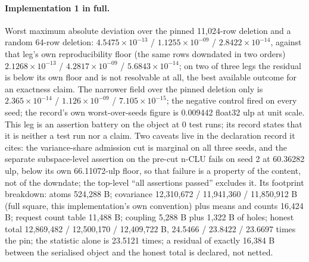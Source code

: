 \documentclass{article} %
\newcommand{\sci}[2]{\ensuremath{#1\times10^{#2}}}
\begin{document}
\paragraph{Implementation 1 in full.} Worst maximum absolute deviation over the pinned 11,024-row
deletion and a random 64-row deletion: \sci{4.5475}{-13} / \sci{1.1255}{-09} / \sci{2.8422}{-14},
against that leg's own reproducibility floor (the same rows downdated in two orders)
\sci{2.1268}{-13} / \sci{4.2817}{-09} / \sci{5.6843}{-14}; on two of three legs the residual is below
its own floor and is not resolvable at all, the best available outcome for an exactness claim. The
narrower field over the pinned deletion only is \sci{2.365}{-14} / \sci{1.126}{-09} /
\sci{7.105}{-15}; the negative control fired on every seed; the record's own worst-over-seeds
figure is 0.009442 float32 ulp at unit scale. %
This leg is an assertion battery on the object at 0 test runs; its record states that it is neither a test
run nor a claim. Two caveats live in the declaration record it cites: the variance-share admission cut is
marginal on all three seeds, and the separate subspace-level assertion on the pre-cut n-CLU fails on
seed 2 at 60.36282 ulp, below its own 66.11072-ulp floor, so that failure is a property of the
content, not of the downdate; the top-level ``all assertions passed'' excludes it.
Its footprint breakdown: atoms 524,288 B; covariance 12,310,672 / 11,941,360 / 11,850,912 B (full
square, this implementation's own convention) plus means and counts 16,424 B; request count table
11,488 B; coupling 5,288 B plus 1,322 B of holes; honest total 12,869,482 / 12,500,170 / 12,409,722
B, 24.5466 / 23.8422 / 23.6697 times the pin; the statistic alone is 23.5121 times; a residual of %
exactly 16,384 B between the serialised object and the honest total is declared, not netted.
\end{document}
